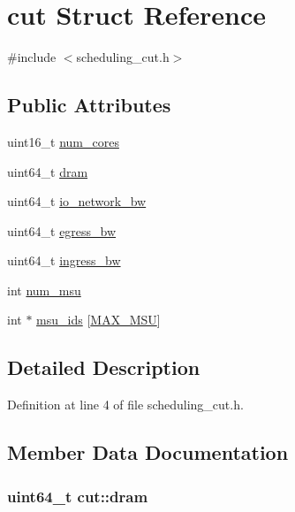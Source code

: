 \hypertarget{structcut}{\section{cut Struct Reference}
\label{structcut}
}


{\ttfamily \#include $<$scheduling\-\_\-cut.\-h$>$}

\subsection*{Public Attributes}
\begin{DoxyCompactItemize}
\item 
uint16\-\_\-t \hyperlink{structcut_a698d9917bec501d6a3f14cba141b03ae}{num\-\_\-cores}
\item 
uint64\-\_\-t \hyperlink{structcut_a483bf993496f8816ec0870711a9c2c4a}{dram}
\item 
uint64\-\_\-t \hyperlink{structcut_a3c0344ad7e8725763aebacac3632b0a6}{io\-\_\-network\-\_\-bw}
\item 
uint64\-\_\-t \hyperlink{structcut_a8d676e103e1e29912c606f34ab34c5cf}{egress\-\_\-bw}
\item 
uint64\-\_\-t \hyperlink{structcut_a3fbcce011fd7ee1410f7fbf2fa27f293}{ingress\-\_\-bw}
\item 
int \hyperlink{structcut_ae96cd38e08c0b4514e75210a12ee17ae}{num\-\_\-msu}
\item 
int $\ast$ \hyperlink{structcut_abdfeb0b19bcc94fc210767f519777a3f}{msu\-\_\-ids} \mbox{[}\hyperlink{dfg_8h_ae4dc3586073212cd441edfe4134132f3}{M\-A\-X\-\_\-\-M\-S\-U}\mbox{]}
\end{DoxyCompactItemize}


\subsection{Detailed Description}


Definition at line 4 of file scheduling\-\_\-cut.\-h.



\subsection{Member Data Documentation}
\hypertarget{structcut_a483bf993496f8816ec0870711a9c2c4a}{
\subsubsection[{dram}]{\setlength{\rightskip}{0pt plus 5cm}uint64\-\_\-t cut\-::dram}}\label{structcut_a483bf993496f8816ec0870711a9c2c4a}



